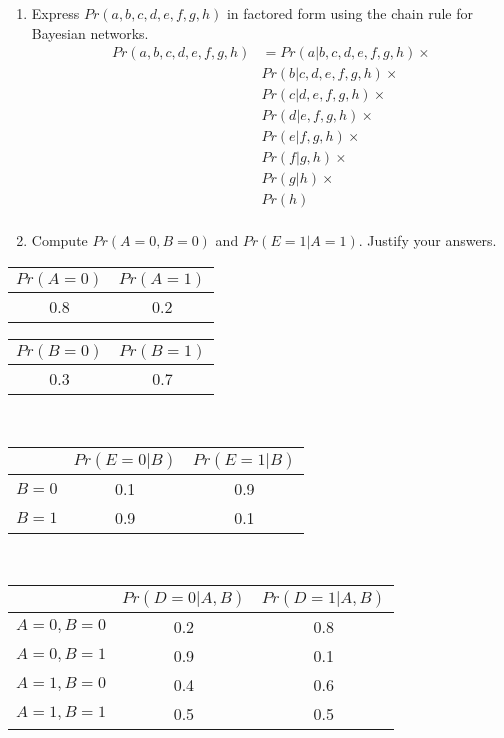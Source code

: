 \documentclass[10.5pt,letterpaper]{article}
\begin{document}
\begin{enumerate}[label=\textbf{Problem \arabic*.}]
\begin{enumerate}[label=(\alph*)]
\begin{itemize}
		\end{itemize}
	\item Express $Pr(a,b,c,d,e,f,g,h)$ in factored form using the chain rule for Bayesian networks.
	\begin{equation}\nonumber\begin{split}
	Pr(a,b,c,d,e,f,g,h) &= Pr(a|b,c,d,e,f,g,h) \times \\
	& Pr(b|c,d,e,f,g,h) \times \\
	& Pr(c|d,e,f,g,h) \times \\
	& Pr(d|e,f,g,h) \times \\
	& Pr(e|f,g,h) \times \\
	& Pr(f|g,h) \times \\
	& Pr(g|h) \times \\
	& Pr(h) \\
	\end{split}\end{equation}
	\item Compute $Pr(A=0,B=0)$ and $Pr(E=1|A=1)$. Justify your answers.
	\end{enumerate}
	\begin{tabular}{|c|c|}
	\hline
	$Pr(A=0)$ & $Pr(A=1)$ \\
	\hline
	0.8 & 0.2 \\
	\hline
	\end{tabular}
	\begin{tabular}{|c|c|}
	\hline
	$Pr(B=0)$ & $Pr(B=1)$ \\
	\hline
	0.3 & 0.7 \\
	\hline
	\end{tabular}\\
	\begin{tabular}{|c|c|c|}
	\hline
	& $Pr(E=0|B)$ & $Pr(E=1|B)$ \\
	\hline
	$B=0$ & 0.1 & 0.9 \\
	\hline
	$B=1$ & 0.9 & 0.1 \\
	\hline
	\end{tabular}\\
	\begin{tabular}{|c|c|c|}
	\hline
	& $Pr(D=0|A,B)$ & $Pr(D=1|A,B)$ \\
	\hline
	$A=0,B=0$ & 0.2 & 0.8 \\
	\hline
	$A=0,B=1$ & 0.9 & 0.1 \\
	\hline
	$A=1,B=0$ & 0.4 & 0.6 \\
	\hline
	$A=1,B=1$ & 0.5 & 0.5 \\
	\hline
	\end{tabular}
	\begin{enumerate}[label=\arabic*)]

\end{enumerate}
\end{enumerate}
\end{document}
